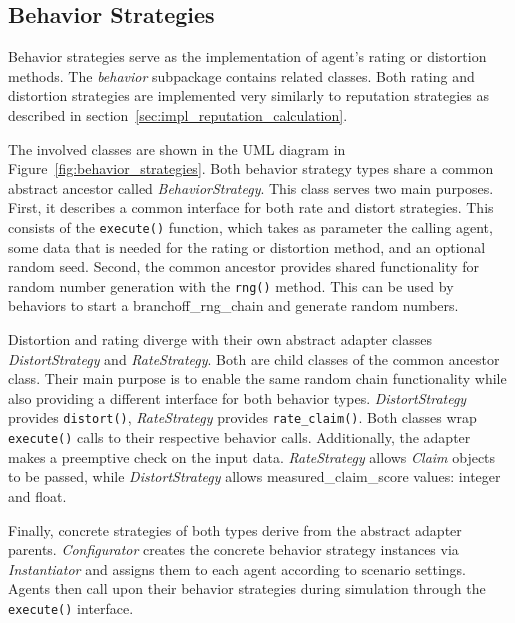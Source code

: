 \documentclass[%
    ]{\PathToTumTemplate/thesis/tum_thesis}
\begin{document}
\subsection{Behavior Strategies}
Behavior strategies serve as the implementation of agent's rating or distortion methods.
The \emph{behavior} subpackage contains related classes.
Both rating and distortion strategies are implemented very similarly to reputation strategies as described in section~\ref{sec:impl_reputation_calculation}.

The involved classes are shown in the UML diagram in Figure~\ref{fig:behavior_strategies}.
Both behavior strategy types share a common abstract ancestor called \emph{BehaviorStrategy}.
This class serves two main purposes.
First, it describes a common interface for both rate and distort strategies.
This consists of the \lstinline{execute()} function, which takes as parameter the calling agent, some data that is needed for the rating or distortion method, and an optional random seed.
Second, the common ancestor provides shared functionality for random number generation with the \lstinline{rng()} method.
This can be used by behaviors to start a \gls{branchoff_rng_chain} and generate random numbers.

Distortion and rating diverge with their own abstract adapter classes \emph{DistortStrategy} and \emph{RateStrategy}.
Both are child classes of the common ancestor class.
Their main purpose is to enable the same random chain functionality while also providing a different interface for both behavior types.
\emph{DistortStrategy} provides \texttt{distort()}, \emph{RateStrategy} provides \texttt{rate\_claim()}.
Both classes wrap \texttt{execute()} calls to their respective behavior calls.
Additionally, the adapter makes a preemptive check on the input data.
\emph{RateStrategy} allows \emph{Claim} objects to be passed, while \emph{DistortStrategy} allows \gls{measured_claim_score} values: integer and float.

Finally, concrete strategies of both types derive from the abstract adapter parents.
\emph{Configurator} creates the concrete behavior strategy instances via \emph{Instantiator} and assigns them to each agent according to scenario settings.
Agents then call upon their behavior strategies during simulation through the \texttt{execute()} interface.
\end{document}

